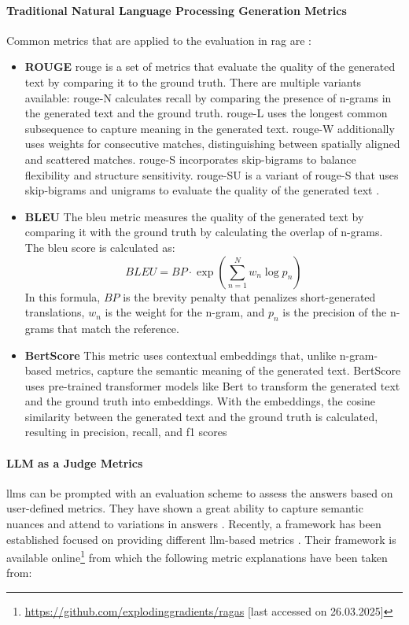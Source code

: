 \paragraph{Traditional Natural Language Processing Generation Metrics} Common metrics that are applied to the evaluation in \gls{rag} are \textcite{yu_evaluation_2024,ibrahim_survey_2024,alinejad_evaluating_2024,alinejad_evaluating_2024}:

\begin{itemize}
    \item \textbf{ROUGE} \gls{rouge} is a set of metrics that evaluate the quality of the generated text by comparing it to the ground truth. There are multiple variants available: \gls{rouge}-N calculates recall by comparing the presence of n-grams in the generated text and the ground truth. \gls{rouge}-L uses the longest common subsequence to capture meaning in the generated text. \gls{rouge}-W additionally uses weights for consecutive matches, distinguishing between spatially aligned and scattered matches. \gls{rouge}-S incorporates skip-bigrams to balance flexibility and structure sensitivity. \gls{rouge}-SU is a variant of \gls{rouge}-S that uses skip-bigrams and unigrams to evaluate the quality of the generated text \cite{lin_rouge_2004}.

    \item \textbf{BLEU} The \acrfull{bleu} metric measures the quality of the generated text by comparing it with the ground truth by calculating the overlap of n-grams\cite{papineni_bleu_2001}. The \gls{bleu} score is calculated as:
    \[
    BLEU = BP \cdot \exp\left(\sum^N_{n=1} w_n \log p_n\right)
    \]
    In this formula, \(BP\) is the brevity penalty that penalizes short-generated translations, \(w_n\) is the weight for the n-gram, and \(p_n\) is the precision of the n-grams that match the reference.

    \item \textbf{BertScore} This metric uses contextual embeddings that, unlike n-gram-based metrics, capture the semantic meaning of the generated text. BertScore uses pre-trained transformer models like Bert to transform the generated text and the ground truth into embeddings. With the embeddings, the cosine similarity between the generated text and the ground truth is calculated, resulting in precision, recall, and f1 scores \cite{zhang_bertscore_2020}

\end{itemize}

\paragraph{LLM as a Judge Metrics} \glspl{llm} can be prompted with an evaluation scheme to assess the answers based on user-defined metrics. They have shown a great ability to capture semantic nuances and attend to variations in answers \cite{alinejad_evaluating_2024,yu_evaluation_2024}. Recently, a framework has been established focused on providing different \gls{llm}-based metrics \cite{es_ragas_2023}. Their framework is available online\footnote{\url{https://github.com/explodinggradients/ragas} [last accessed on 26.03.2025]} from which the following metric explanations have been taken from:

